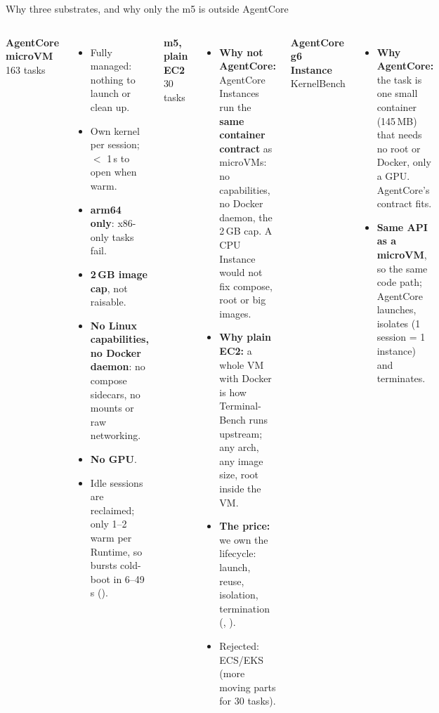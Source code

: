 \begin{frame}{Why three substrates, and why only the m5 is outside AgentCore}
\begin{columns}[T]
\textbf{\footnotesize\textcolor{cat2}{AgentCore microVM}} {\tiny 163 tasks}
\begin{itemize}\tiny\setlength{\itemsep}{0.5mm}
\item[+] Fully managed: nothing to launch or clean up.
\item[+] Own kernel per session; $<$ 1\,s to open when warm.
\item[$-$] \textbf{arm64 only}: x86-only tasks fail.
\item[$-$] \textbf{2\,GB image cap}, not raisable.
\item[$-$] \textbf{No Linux capabilities, no Docker daemon}: no compose sidecars, no mounts or raw networking.
\item[$-$] \textbf{No GPU}.
\item[$-$] Idle sessions are reclaimed; only 1--2 warm per Runtime, so bursts cold-boot in 6--49\,s ().
\end{itemize}
\textbf{\footnotesize\textcolor{cat1}{m5, plain EC2}} {\tiny 30 tasks}
\begin{itemize}\tiny\setlength{\itemsep}{0.5mm}
\item \textbf{Why not AgentCore:} AgentCore Instances run the \textbf{same container contract} as microVMs: no capabilities, no Docker daemon, the 2\,GB cap. A CPU Instance would not fix compose, root or big images.
\item \textbf{Why plain EC2:} a whole VM with Docker is how Terminal-Bench runs upstream; any arch, any image size, root inside the VM.
\item \textbf{The price:} we own the lifecycle: launch, reuse, isolation, termination (, ).
\item Rejected: ECS/EKS (more moving parts for 30 tasks).
\end{itemize}
\textbf{\footnotesize\textcolor{cat3}{AgentCore g6 Instance}} {\tiny KernelBench}
\begin{itemize}\tiny\setlength{\itemsep}{0.5mm}
\item \textbf{Why AgentCore:} the task is one small container (145\,MB) that needs no root or Docker, only a GPU. AgentCore's contract fits.
\item \textbf{Same API as a microVM}, so the same code path; AgentCore launches, isolates (1 session = 1 instance) and terminates.

\end{itemize}
\end{columns}
\end{frame}
